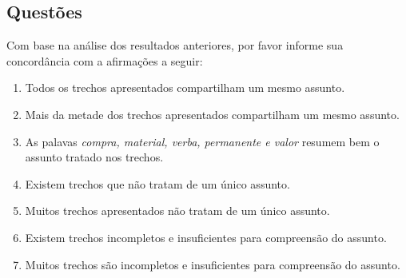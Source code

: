 \newpage

\subsection*{Questões}


Com base na análise dos resultados anteriores, por favor informe sua concordância com a afirmações a seguir:





\begin{enumerate}

\item Todos os trechos apresentados compartilham um mesmo assunto.
\likert

\item Mais da metade dos trechos apresentados compartilham um mesmo assunto.
\likert

\item As palavas \textit{compra, material, verba, permanente e valor} resumem bem o assunto tratado nos trechos.
\likert

\item Existem trechos que não tratam de um único assunto.
\likert

\item Muitos trechos apresentados não tratam de um único assunto. 
\likert

\item Existem trechos incompletos e insuficientes para compreensão do assunto.
\likert

\item Muitos trechos são incompletos e insuficientes para compreensão do assunto.
\likert



\end{enumerate}







